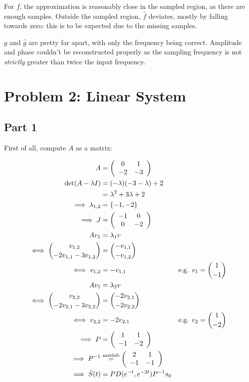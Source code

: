 \documentclass[a4paper,parskip,headheight=38pt]{scrartcl} %
\begin{document}
For $f$, the approximation is reasonably close in the sampled region,
as there are enough samples.  Outside the sampled region, $\hat{f}$
deviates, mostly by falling towards zero: this is to be expected due to
the missing samples.

$g$ and $\hat{g}$ are pretty far apart, with only the frequency being
correct.  Amplitude and phase couldn't be reconstructed properly as the
sampling frequency is not \emph{strictly} greater than twice the input
frequency.


\section*{Problem 2: Linear System}

\subsection*{Part 1}

First of all, compute $A$ as a matrix:

\begin{align*}
    A &= \left( \begin{array}{cc} 0 & 1 \\ -2 & -3 \end{array} \right) \\
    \det(A - \lambda I) &= (-\lambda)(-3-\lambda) + 2 \\
    &= \lambda^2 + 3\lambda + 2 \\
    \implies \lambda_{1,2} &= \{-1, -2\} \\
    \implies J &= \left( \begin{array}{cc} -1 & 0 \\ 0 & -2 \end{array} \right) \\
    Av_1 &= \lambda_1 v \\
    \iff \binom{v_{1,2}}{-2v_{1,1}-3v_{1,2}} &= \binom{-v_{1,1}}{-v_{1,2}} \\
    \iff v_{1,2} &= -v_{1,1} & \text{e.g. } v_1 = \binom{1}{-1} \\
    Av_1 &= \lambda_2 v \\
    \iff \binom{v_{2,2}}{-2v_{2,1}-3v_{2,2}} &= \binom{-2v_{2,1}}{-2v_{2,2}} \\
    \iff v_{2,2} &= -2 v_{2,1} & \text{e.g. } v_2 = \binom{1}{-2} \\
    \implies P &= \left( \begin{array}{cc} 1 & 1 \\ -1 & -2 \end{array} \right) \\
    \implies P^{-1} &\overset{\text{\scriptsize{matlab}}}{=} \left( \begin{array}{cc} 2 & 1 \\ -1 & -1 \end{array} \right) \\
    \implies \bar{S}(t) &= P D(e^{-t}, e^{-2t}) P^{-1} s_0
\end{align*}
\end{document}
